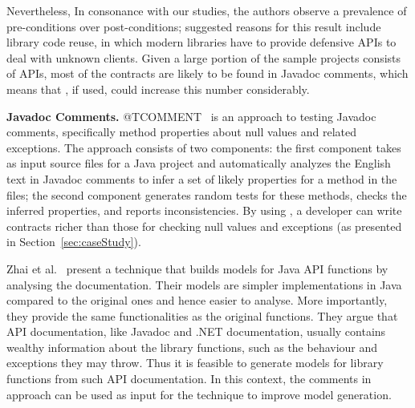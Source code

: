 Nevertheless, In consonance with our studies, the authors observe a prevalence of pre-conditions over post-conditions; suggested reasons for this result include library code reuse, in which modern libraries have to provide defensive APIs to deal with unknown clients. Given a large portion of the sample projects consists of APIs, most of the contracts are likely to be found in Javadoc comments, which means that \contractjdoc{}, if used, could increase this number considerably.

\textbf{Javadoc Comments.}
@TCOMMENT~\cite{atComment} is an approach to testing Javadoc comments, specifically method properties about null values and related exceptions. The approach consists of two components: the first component takes as input source files for a Java project and automatically analyzes the English text in Javadoc comments to
infer a set of likely properties for a method in the files; the second component generates random tests for these methods, checks the inferred properties, and reports inconsistencies. By using
\contractjdoc{}, a developer can write contracts richer than those for checking null values and exceptions (as presented in Section~\ref{sec:caseStudy}).

Zhai et al.~\cite{docAnalysis} present a technique that builds models for Java API functions by analysing the documentation. Their models are simpler implementations in Java compared to the original ones and hence easier to analyse. More importantly, they provide the same functionalities as the original functions. They argue that API documentation, like Javadoc and .NET documentation, usually contains wealthy information about the library functions, such as the behaviour and exceptions they may throw. Thus it is feasible to generate models for library functions from such API documentation. In this context, the comments in \contractjdoc{} approach can be used as input for the technique to improve model generation.


